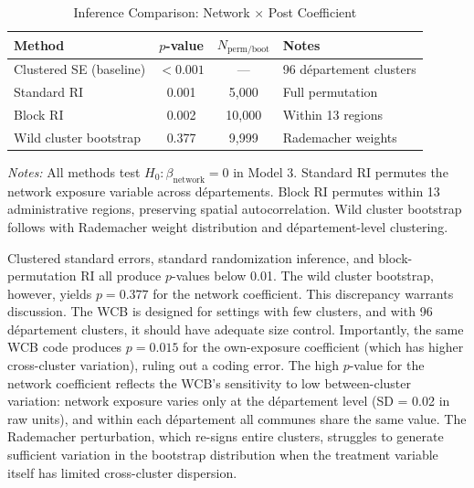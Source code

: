 \documentclass[12pt]{article}
\newcommand{\dept}{d\'{e}partement}
\newcommand{\depts}{d\'{e}partements}
\begin{document}
\begin{table}[H]
\centering
\caption{Inference Comparison: Network $\times$ Post Coefficient}
\label{tab:inference}
\begin{threeparttable}
\begin{tabular}{@{}lccl@{}}
\toprule
Method & $p$-value & $N_{\text{perm/boot}}$ & Notes \\
\midrule
Clustered SE (baseline) & $< 0.001$ & --- & 96 \dept{} clusters \\
Standard RI & 0.001 & 5,000 & Full permutation \\
Block RI & 0.002 & 10,000 & Within 13 regions \\
Wild cluster bootstrap & 0.377 & 9,999 & Rademacher weights \\
\bottomrule
\end{tabular}
\begin{tablenotes}
\small
\item \textit{Notes:} All methods test $H_0: \beta_{\text{network}} = 0$ in Model 3. Standard RI permutes the network exposure variable across \depts{}. Block RI permutes within 13 administrative regions, preserving spatial autocorrelation. Wild cluster bootstrap follows \citet{cameron2008bootstrap} with Rademacher weight distribution and \dept{}-level clustering.
\end{tablenotes}
\end{threeparttable}
\end{table}

Clustered standard errors, standard randomization inference, and block-permutation RI all produce $p$-values below 0.01. The wild cluster bootstrap, however, yields $p = 0.377$ for the network coefficient. This discrepancy warrants discussion. The WCB is designed for settings with few clusters, and with 96 \dept{} clusters, it should have adequate size control. Importantly, the same WCB code produces $p = 0.015$ for the own-exposure coefficient (which has higher cross-cluster variation), ruling out a coding error. The high $p$-value for the network coefficient reflects the WCB's sensitivity to low between-cluster variation: network exposure varies only at the \dept{} level (SD = 0.02 in raw units), and within each \dept{} all communes share the same value. The Rademacher perturbation, which re-signs entire clusters, struggles to generate sufficient variation in the bootstrap distribution when the treatment variable itself has limited cross-cluster dispersion.
\end{document}
